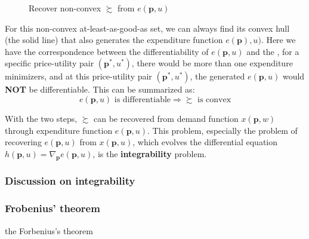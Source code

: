\begin{figure}[ht]
    \centering
    \caption{Recover non-convex $\succsim$ from $e(\mathbf{p},u)$}
    \label{fig:recover_pref_from_exp_nonconvex}
\end{figure}

For this non-convex at-least-as-good-as set, we can always find its convex hull (the solid line) that also generates the
expenditure function $e(\mathbf{p}),u)$. 
Here we have the correspondence between the differentiability of $e(\mathbf{p},u)$ and the , for a specific price-utility pair $(\mathbf{p}^*,u^*)$, there would be more than one expenditure minimizers, and at this price-utility pair $(\mathbf{p}^*,u^*)$,
 the generated $e(\mathbf{p},u)$ would \textbf{NOT} be differentiable. This can be summarized as:
$$
e(\mathbf{p},u) \text{ is differentiable}\Rightarrow \succsim \text{ is convex}
$$

With the two steps, $\succsim$ can be recovered from demand function $x(\mathbf{p},w)$ through expenditure function $e(\mathbf{p},u)$. This problem, especially the problem of recovering $e(\mathbf{p},u)$ from $x(\mathbf{p},u)$, which evolves the differential equation $h(\mathbf{p},u)=\nabla_{\mathbf{p}}e(\mathbf{p},u)$, is the \textbf{integrability} problem.

\subsubsection*{Discussion on integrability}\label{sssec:integrability}

\subsubsection*{Frobenius' theorem}\label{sssec:frobenius_theorem}
the Forbenius's theorem